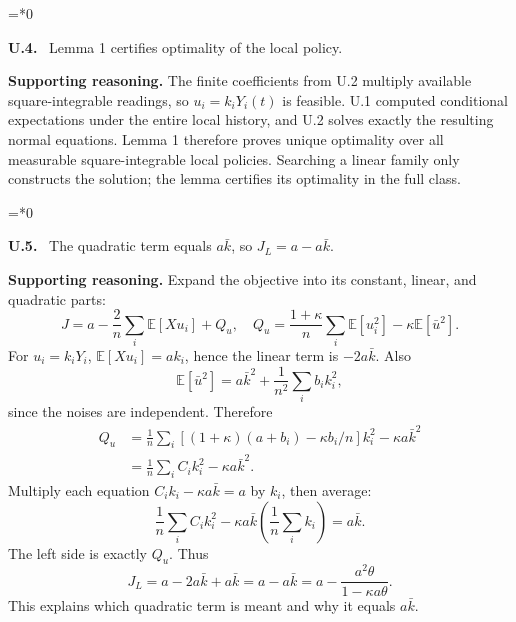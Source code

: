 \documentclass[12pt,letterpaper]{article}
\newcommand{\E}{\mathbb E}
\newenvironment{proofstep}[2]{%
  \begin{list}{}{\leftmargin=\dimexpr 0.17in*#2\relax%
  \setlength{\rightmargin}{0pt}\setlength{\topsep}{5pt}\setlength{\parsep}{2pt}}%
  \item[]\textbf{\textcolor{ink}{#1.}}\ }{\end{list}}
\begin{document}
\begin{proofstep}{U.4}{0}
\label{step:U.4}
Lemma 1 certifies optimality of the local policy.

\textbf{Supporting reasoning.}
The finite coefficients from U.2 multiply available square-integrable readings, so $u_i=k_iY_i(t)$ is feasible. U.1 computed conditional expectations under the entire local history, and U.2 solves exactly the resulting normal equations. Lemma 1 therefore proves unique optimality over all measurable square-integrable local policies. Searching a linear family only constructs the solution; the lemma certifies its optimality in the full class.
\par{}
\end{proofstep}

\begin{proofstep}{U.5}{0}
\label{step:U.5}
The quadratic term equals $a\bar k$, so $J_L=a-a\bar k$.

\textbf{Supporting reasoning.}
Expand the objective into its constant, linear, and quadratic parts:
\[
J=a-\frac2n\sum_i\E[Xu_i]+Q_u,
\quad Q_u=\frac{1+\kappa}{n}\sum_i\E[u_i^2]-\kappa\E[\bar u^2].
\]
For $u_i=k_iY_i$, $\E[Xu_i]=ak_i$, hence the linear term is $-2a\bar k$. Also
\[
\E[\bar u^2]=a\bar k^2+\frac1{n^2}\sum_i b_i k_i^2,
\]
since the noises are independent. Therefore
\begin{align*}
Q_u&=\frac1n\sum_i[(1+\kappa)(a+b_i)-\kappa b_i/n]k_i^2-\kappa a\bar k^2\\
&=\frac1n\sum_iC_i k_i^2-\kappa a\bar k^2.
\end{align*}
Multiply each equation $C_i k_i-\kappa a\bar k=a$ by $k_i$, then average:
\[
\frac1n\sum_iC_i k_i^2-\kappa a\bar k\left(\frac1n\sum_i k_i\right)=a\bar k.
\]
The left side is exactly $Q_u$. Thus
\[
J_L=a-2a\bar k+a\bar k=a-a\bar k
=a-\frac{a^2\theta}{1-\kappa a\theta}.
\]
This explains which quadratic term is meant and why it equals $a\bar k$.
\par{}
\end{proofstep}
\end{document}
